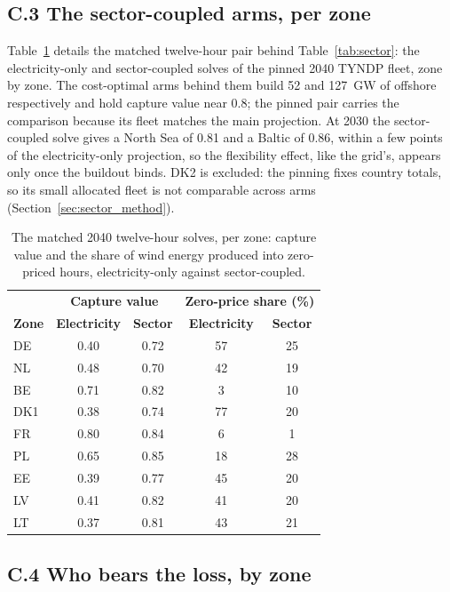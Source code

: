 \subsection*{C.3 The sector-coupled arms, per zone}

Table~\ref{tab:sector_zones} details the matched twelve-hour pair behind
Table~\ref{tab:sector}: the electricity-only and sector-coupled solves of the
pinned 2040 TYNDP fleet, zone by zone. The cost-optimal arms behind them build
52 and 127~GW of offshore respectively and hold capture value near 0.8; the
pinned pair carries the comparison because its fleet matches the main
projection. At 2030 the sector-coupled solve gives a North Sea of 0.81 and a
Baltic of 0.86, within a few points of the electricity-only projection, so the
flexibility effect, like the grid's, appears only once the buildout binds. DK2
is excluded: the pinning fixes country totals, so its small allocated fleet is
not comparable across arms (Section~\ref{sec:sector_method}).

\begin{table}[!htb]
\centering\small
\caption{The matched 2040 twelve-hour solves, per zone: capture value and the
share of wind energy produced into zero-priced hours, electricity-only against
sector-coupled.}
\label{tab:sector_zones}
\begin{tabular}{l c c c c}
\toprule
& \multicolumn{2}{c}{\textbf{Capture value}} &
\multicolumn{2}{c}{\textbf{Zero-price share (\%)}} \\
\textbf{Zone} & \textbf{Electricity} & \textbf{Sector} & \textbf{Electricity} &
\textbf{Sector} \\
\midrule
DE  & 0.40 & 0.72 & 57 & 25 \\
NL  & 0.48 & 0.70 & 42 & 19 \\
BE  & 0.71 & 0.82 & 3  & 10 \\
DK1 & 0.38 & 0.74 & 77 & 20 \\
FR  & 0.80 & 0.84 & 6  & 1  \\
PL  & 0.65 & 0.85 & 18 & 28 \\
EE  & 0.39 & 0.77 & 45 & 20 \\
LV  & 0.41 & 0.82 & 41 & 20 \\
LT  & 0.37 & 0.81 & 43 & 21 \\
\bottomrule
\end{tabular}
\end{table}

\subsection*{C.4 Who bears the loss, by zone}

